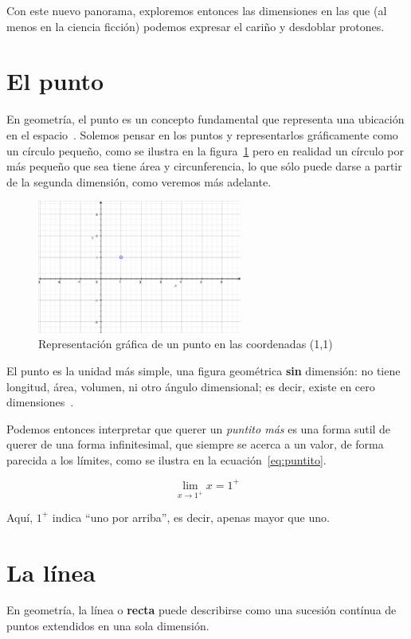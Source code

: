 \documentclass[12pt, oneside]{article}
\begin{document}
Con este nuevo panorama, exploremos entonces las dimensiones en las que (al menos en la ciencia ficción) podemos 
expresar el cariño y desdoblar protones.

\section{El punto}
\label{sec:punto}
En geometría, el punto es un concepto fundamental que representa una ubicación en el espacio~\cite{eswiki:punto}. 
Solemos pensar en los puntos y representarlos gráficamente como un círculo pequeño, como se ilustra en la figura~\ref{fig:grafPunto} pero en realidad un círculo por más pequeño que sea tiene área y circunferencia, lo que sólo puede darse a partir de la segunda dimensión, como veremos más adelante.

\begin{figure}[h]
\centering
\includegraphics[width=0.6\textwidth]{grafPunto.png}
\caption{Representación gráfica de un punto en las coordenadas (1,1)}
\label{fig:grafPunto}
\end{figure}

El punto es la unidad más simple, una figura geométrica \textbf{sin} dimensión: no tiene longitud, área, volumen, ni otro ángulo dimensional; es decir, existe en cero dimensiones~\cite{book:Geometry4Teach}.

Podemos entonces interpretar que querer un \textit{puntito más} es una forma sutil de querer de una forma infinitesimal, que siempre se acerca a un valor, de forma parecida a los límites, como se ilustra en la ecuación~\ref{eq:puntito}.

\begin{equation}
\label{eq:puntito}
\lim_{x \to 1^+} x = 1^+
\end{equation}

Aquí, $1^+$ indica “uno por arriba”, es decir, apenas mayor que uno.

\section{La línea}
\label{sec:linea}
En geometría, la línea o \textbf{recta} puede describirse como una sucesión contínua de puntos extendidos en una sola dimensión.
\end{document}
